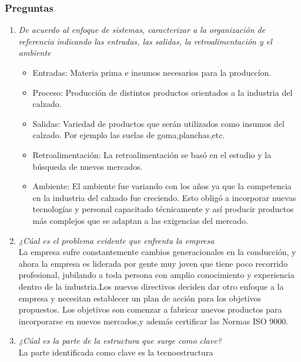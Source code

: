 \documentclass[a4paper,10pt]{article}
\begin{document}
	\subsubsection{Preguntas}
	
	\begin{enumerate}
		
			\item \textit{ De acuerdo al enfoque de sistemas, caracterizar a la organización de referencia indicando las entradas, las salidas, la retroalimentación y el ambiente}\\
			
			
			\begin{itemize}
			\item Entradas:
			Materia prima e insumos necesarios para la produccíon.
			\item Proceso:
			Producción de  distintos productos orientados a la industria del calzado.
			\item Salidas:
			Variedad de productos que serán utilizados como insumos del calzado. Por ejemplo las suelas de goma,planchas,etc.
			\item Retroalimentación:
			La retroalimentación se basó en el estudio y la búsqueda de nuevos mercados.
			
			\item Ambiente:
			El ambiente fue variando con los años ya que la competencia en la industria del calzado fue creciendo. Esto obligó a incorporar nuevas tecnologías y personal capacitado técnicamente y así producir productos más complejos que se adaptan a las exigencias del mercado.
			\end{itemize}		
			
			\item \textit{¿Cúal es el problema evidente que enfrenta la empresa}\\
			La empresa sufre constantemente cambios generacionales en la conducción, y  ahora la empresa es liderada por gente muy joven que tiene poco recorrido profesional, jubilando a toda persona con amplio conocimiento y experiencia dentro de la industria.Los nuevos directivos deciden dar otro enfoque a la empresa y necesitan establecer un plan de acción para los objetivos propuestos. Los objetivos son comenzar a fabricar nuevos productos para incorporarse en nuevos mercados,y además certificar las Normas ISO 9000.
			
			\item \textit{¿Cúal es la parte de la estructura que surge como clave?}\\
			La parte identificada como clave es la tecnoestructura \\


\end{enumerate}
\end{document}
